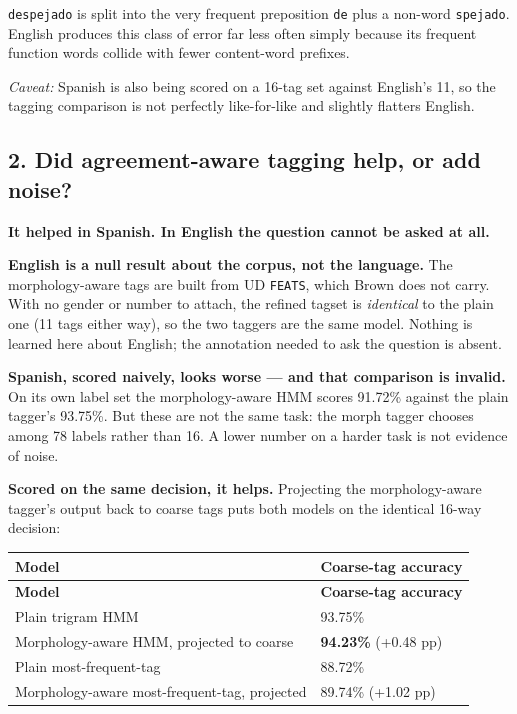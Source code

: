 \documentclass[11pt,a4paper]{article}
\begin{document}
\texttt{despejado} is split into the very frequent preposition \texttt{de} plus a non-word \texttt{spejado}. English produces this class of error far less often simply because its frequent function words collide with fewer content-word prefixes.

\textit{Caveat:} Spanish is also being scored on a 16-tag set against English's 11, so the tagging comparison is not perfectly like-for-like and slightly flatters English.

\subsection*{2. Did agreement-aware tagging help, or add noise?}

\textbf{It helped in Spanish. In English the question cannot be asked at all.}

\textbf{English is a null result about the corpus, not the language.} The morphology-aware tags are built from UD \texttt{FEATS}, which Brown does not carry. With no gender or number to attach, the refined tagset is \textit{identical} to the plain one (11 tags either way), so the two taggers are the same model. Nothing is learned here about English; the annotation needed to ask the question is absent.

\textbf{Spanish, scored naively, looks worse --- and that comparison is invalid.} On its own label set the morphology-aware HMM scores 91.72\% against the plain tagger's 93.75\%. But these are not the same task: the morph tagger chooses among 78 labels rather than 16. A lower number on a harder task is not evidence of noise.

\textbf{Scored on the same decision, it helps.} Projecting the morphology-aware tagger's output back to coarse tags puts both models on the identical 16-way decision:

{\small
\setlength{\tabcolsep}{4pt}
\begin{longtable}{ll}
\toprule
\textbf{Model} & \textbf{Coarse-tag accuracy} \\
\midrule
\endfirsthead
\toprule
\textbf{Model} & \textbf{Coarse-tag accuracy} \\
\midrule
\endhead
Plain trigram HMM & 93.75\% \\
Morphology-aware HMM, projected to coarse & \textbf{94.23\%} (+0.48 pp) \\
Plain most-frequent-tag & 88.72\% \\
Morphology-aware most-frequent-tag, projected & 89.74\% (+1.02 pp) \\
\bottomrule
\end{longtable}}
\end{document}
